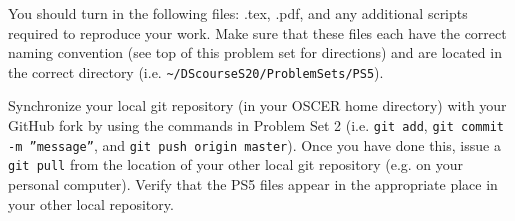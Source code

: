 \documentclass[12pt,english]{exam}
\begin{document}
\begin{questions}
\question You should turn in the following files: .tex, .pdf,  and any additional scripts required to reproduce your work.  Make sure that these files each have the correct naming convention (see top of this problem set for directions) and are located in the correct directory (i.e. \texttt{\textasciitilde/DScourseS20/ProblemSets/PS5}).

\question Synchronize your local git repository (in your OSCER home directory) with your GitHub fork by using the commands in Problem Set 2 (i.e. \texttt{git add}, \texttt{git commit -m ''message''}, and \texttt{git push origin master}). Once you have done this, issue a \texttt{git pull} from the location of your other local git repository (e.g. on your personal computer). Verify that the PS5 files appear in the appropriate place in your other local repository.

\end{questions}
\end{document}
